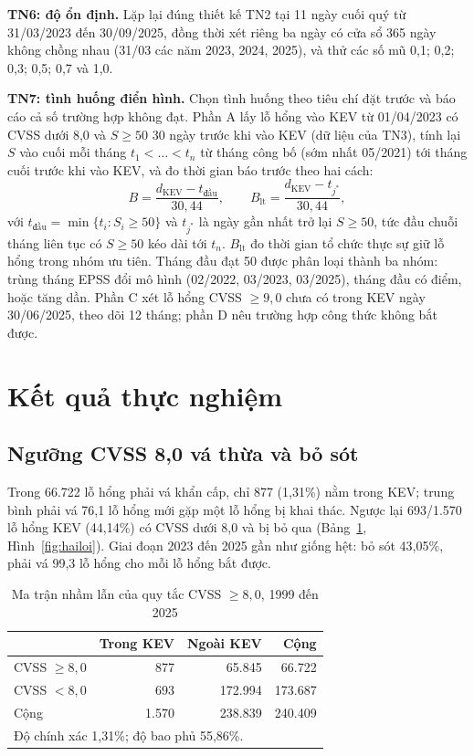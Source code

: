 \documentclass[conference]{IEEEtran}
\begin{document}
\textbf{TN6: độ ổn định.} Lặp lại đúng thiết kế TN2 tại 11 ngày cuối quý từ 31/03/2023 đến
30/09/2025, đồng thời xét riêng ba ngày có cửa sổ 365 ngày không chồng nhau (31/03 các năm 2023, 2024,
2025), và thử các số mũ 0,1; 0,2; 0,3; 0,5; 0,7 và 1,0.

\textbf{TN7: tình huống điển hình.} Chọn tình huống theo tiêu chí đặt trước và báo cáo cả số
trường hợp không đạt. Phần A lấy lỗ hổng vào KEV từ 01/04/2023 có CVSS dưới 8,0 và $S \ge 50$ 30
ngày trước khi vào KEV (dữ liệu của TN3), tính lại $S$ vào cuối mỗi tháng $t_1 < \dots < t_n$ từ
tháng công bố (sớm nhất 05/2021) tới tháng cuối trước khi vào KEV, và đo thời gian báo trước theo
hai cách:
\begin{equation}
B = \frac{d_{\mathrm{KEV}} - t_{\text{đầu}}}{30{,}44}, \qquad
B_{\text{lt}} = \frac{d_{\mathrm{KEV}} - t_{j^*}}{30{,}44},
\end{equation}
với $t_{\text{đầu}} = \min \lbrace t_i : S_i \ge 50 \rbrace$ và $t_{j^*}$ là ngày gần nhất trở
lại $S \ge 50$, tức đầu chuỗi tháng liên tục có $S \ge 50$ kéo dài tới $t_n$. $B_{\text{lt}}$ đo
thời gian tổ chức thực sự giữ lỗ hổng trong nhóm ưu tiên. Tháng đầu đạt 50 được phân loại thành ba nhóm: trùng tháng EPSS đổi mô hình (02/2022, 03/2023, 03/2025), tháng đầu có điểm, hoặc tăng dần. Phần C xét
lỗ hổng CVSS $\ge 9{,}0$ chưa có trong KEV ngày 30/06/2025, theo dõi 12 tháng; phần D nêu trường
hợp công thức không bắt được.

\section{Kết quả thực nghiệm}\label{sec:ketqua}

\subsection{Ngưỡng CVSS 8,0 vá thừa và bỏ sót}
Trong 66.722 lỗ hổng phải vá khẩn cấp, chỉ 877 (1,31\%) nằm trong KEV; trung bình phải vá 76,1 lỗ hổng mới gặp một lỗ hổng bị khai thác. Ngược lại 693/1.570 lỗ hổng KEV (44,14\%) có CVSS dưới
8,0 và bị bỏ qua (Bảng~\ref{tab:bonnhom}, Hình~\ref{fig:hailoi}). Giai đoạn 2023 đến 2025 gần như
giống hệt: bỏ sót 43,05\%, phải vá 99,3 lỗ hổng cho mỗi lỗ hổng bắt được.

\begin{table}[htbp]
\caption{Ma trận nhầm lẫn của quy tắc CVSS $\ge 8{,}0$, 1999 đến 2025}\label{tab:bonnhom}
\centering
\begin{tabular}{lrrr}
\toprule
 & Trong KEV & Ngoài KEV & Cộng \\
\midrule
CVSS $\ge 8{,}0$ & 877 & 65.845 & 66.722 \\
CVSS $< 8{,}0$   & 693 & 172.994 & 173.687 \\
\midrule
Cộng & 1.570 & 238.839 & 240.409 \\
\bottomrule
\multicolumn{4}{l}{\footnotesize Độ chính xác 1,31\%; độ bao phủ 55,86\%.}
\end{tabular}
\end{table}
\end{document}
